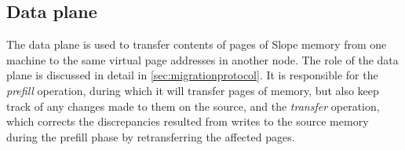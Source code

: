 

\subsection{Data plane}
The data plane is used to transfer contents of pages of Slope
memory from one machine to the same virtual page addresses in another node.
The role of the data plane is discussed in detail in \ref{sec:migrationprotocol}.
It is responsible for the \emph{prefill} operation, during which it will
transfer pages of memory, but also keep track of any changes made to them on
the source, and the \emph{transfer} operation, which corrects the discrepancies
resulted from writes to the source memory during the prefill phase by
retransferring the affected pages.



